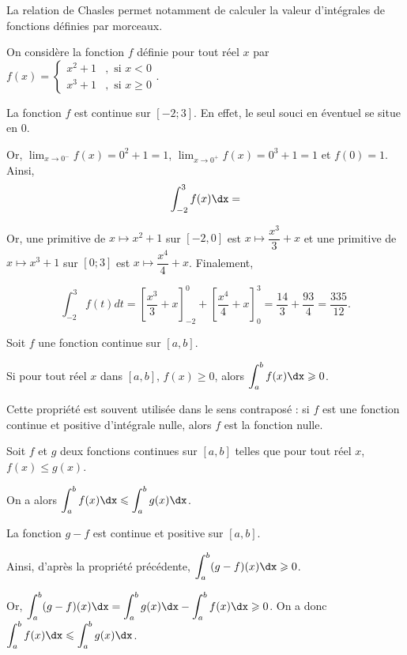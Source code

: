 \documentclass[11pt,fleqn, openany]{book} %
\begin{document}
 La relation de Chasles permet notamment de calculer la valeur d'intégrales de fonctions définies par morceaux.
 
\begin{example} On considère la fonction $f$ définie pour tout réel $x$ par \renewcommand{\arraystretch}{1}$f(x)=\left\{\begin{array}{ll} x^2+1&,\text{ si }x<0\\ x^3+1&,\text{ si }x\geqslant 0\end{array}\right.$.

La fonction $f$ est continue sur $[-2;3]$. En effet, le seul souci en éventuel se situe en 0. 

Or, $\displaystyle\lim_{x\to 0^-} f(x)= 0^2+1=1$, $\displaystyle\lim_{x\to 0^+} f(x)= 0^3+1=1$ et $f(0)=1$. Ainsi,
 \[\displaystyle\int_{-2}^3 f(x)\dx=\]
 
 Or, une primitive de $x\mapsto x^2+1$ sur $[-2,0]$ est $x\mapsto \dfrac{x^3}{3}+x$ et une primitive de $x\mapsto x^3+1$ sur $[0;3]$ est $x\mapsto \dfrac{x^4}{4}+x$. Finalement,
 
 \[\displaystyle\int_{-2}^3 f(t)dt=\left[\dfrac{x^3}{3}+x\right]_{-2}^0+\left[\dfrac{x^4}{4}+x\right]_0^3=\dfrac{14}{3}+\dfrac{93}{4}=\dfrac{335}{12}.\]\vspace{-0.5cm}\end{example}



\begin{proposition} Soit $f$ une fonction continue sur $[a,b]$.

Si pour tout réel $x$ dans $[a,b]$, $f(x)\geqslant 0$, alors $\displaystyle\int_{a}^b f(x)\dx \geqslant 0$.
\end{proposition}

Cette propriété est souvent utilisée dans le sens contraposé : si $f$ est une fonction continue et positive d'intégrale nulle, alors $f$ est la fonction nulle.

\begin{proposition} Soit $f$ et $g$ deux fonctions continues sur $[a,b]$ telles que pour tout réel $x$, $f(x)\leqslant g(x)$.

On a alors $\displaystyle\int_{a}^b f(x)\dx\leqslant \displaystyle\int_{a}^b g(x)\dx$.\end{proposition}

\begin{demonstration} La fonction $g-f$ est continue et positive sur $[a,b]$. 

Ainsi, d'après la propriété précédente, $\displaystyle\int_{a}^b(g- f)(x)\dx \geqslant 0$. 

Or, $\displaystyle\int_{a}^b (g-f)(x)\dx=\displaystyle\int_{a}^b g(x)\dx-\displaystyle\int_{a}^b f(x)\dx \geqslant 0$. On a donc $\displaystyle\int_{a}^b f(x)\dx \leqslant \displaystyle\int_{a}^b g(x)\dx$.\end{demonstration}
\end{document}
